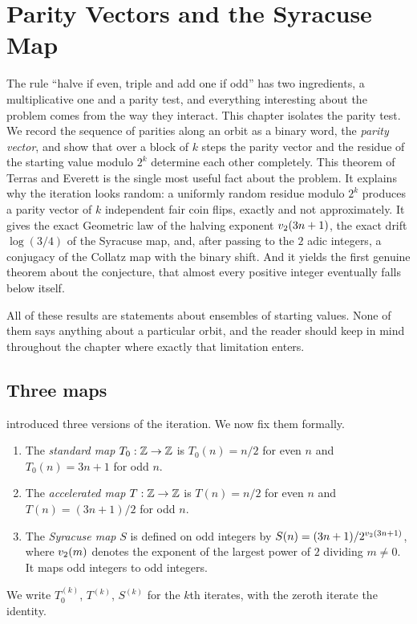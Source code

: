 \chapter{Parity Vectors and the Syracuse Map}\label{chap:parity}

The rule ``halve if even, triple and add one if odd'' has two ingredients, a
multiplicative one and a parity test, and everything interesting about the
problem comes from the way they interact. This chapter isolates the parity
test. We record the sequence of parities along an orbit as a binary word, the
\emph{parity vector}, and show that over a block of $k$ steps the parity
vector and the residue of the starting value modulo $2^k$ determine each other
completely. This theorem of Terras and Everett is the single most useful fact about the
problem. It explains why the iteration looks random: a uniformly random
residue modulo $2^k$ produces a parity vector of $k$ independent fair coin
flips, exactly and not approximately. It gives the exact Geometric law of the
halving exponent $v_2(3n+1)$, the exact drift $\log(3/4)$ of the Syracuse
map, and, after passing to the $2$ adic integers, a conjugacy of the Collatz
map with the binary shift. And it yields the first genuine theorem about the
conjecture, that almost every positive integer eventually falls below itself.

All of these results are statements about ensembles of starting values. None
of them says anything about a particular orbit, and the reader should keep in
mind throughout the chapter where exactly that limitation enters.

\section{Three maps}\label{sec:ch2:maps}

 introduced three versions of the iteration. We now fix
them formally.

\begin{definition}\label{def:maps}
\leavevmode
\begin{enumerate}[label=(\roman*),leftmargin=2em]
\item The \emph{standard map} $T_0:\mathbb{Z}\to\mathbb{Z}$ is $T_0(n)=n/2$ for even $n$ and
  $T_0(n)=3n+1$ for odd $n$.
\item The \emph{accelerated map} $T:\mathbb{Z}\to\mathbb{Z}$ is $T(n)=n/2$ for even $n$ and
  $T(n)=(3n+1)/2$ for odd $n$.
\item The \emph{Syracuse map} $S$ is defined on odd integers by
  $S(n)=(3n+1)/2^{v_2(3n+1)}$, where $v_2(m)$ denotes the exponent of the
  largest power of $2$ dividing $m\neq0$. It maps odd integers to odd
  integers.
\end{enumerate}
We write $T_0^{(k)}$, $T^{(k)}$, $S^{(k)}$ for the $k$th iterates, with the
zeroth iterate the identity.
\end{definition}

